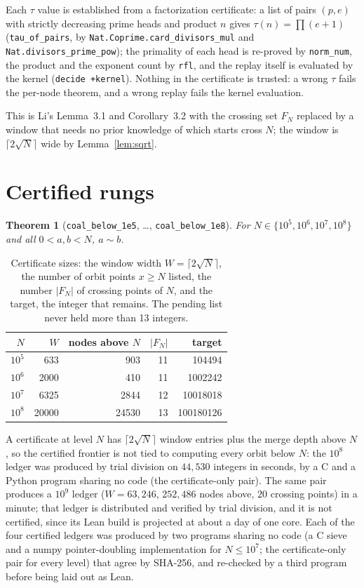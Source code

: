 \documentclass[11pt]{article}
\theoremstyle{plain}
\newtheorem{theorem}{Theorem}[section]
\theoremstyle{definition}
\newcommand{\Coal}{\sim}
\begin{document}
Each $\tau$ value is established from a factorization certificate: a list of pairs $(p,e)$ with strictly decreasing prime heads and product $n$ gives $\tau(n)=\prod(e+1)$ (\texttt{tau\_of\_pairs}, by \texttt{Nat.Coprime.card\_divisors\_mul} and \texttt{Nat.divisors\_prime\_pow}); the primality of each head is re-proved by \texttt{norm\_num}, the product and the exponent count by \texttt{rfl}, and the replay itself is evaluated by the kernel (\texttt{decide +kernel}). Nothing in the certificate is trusted: a wrong $\tau$ fails the per-node theorem, and a wrong replay fails the kernel evaluation.

This is Li's Lemma~3.1 and Corollary~3.2 with the crossing set $F_N$ replaced by a window that needs no prior knowledge of which starts cross $N$; the window is $\lceil 2\sqrt N\rceil$ wide by Lemma~\ref{lem:sqrt}.

\section{Certified rungs}
\label{sec:rungs}

\begin{theorem}[\texttt{coal\_below\_1e5}, \dots, \texttt{coal\_below\_1e8}]
\label{thm:rungs}
For $N\in\{10^5,10^6,10^7,10^8\}$ and all $0<a,b<N$, $a\Coal b$.
\end{theorem}

\begin{table}[h]
\centering
\begin{tabular}{@{}rrrrr@{}}
\toprule
$N$ & $W$ & nodes above $N$ & $|F_N|$ & target \\
\midrule
$10^5$ & 633 & 903 & 11 & 104494 \\
$10^6$ & 2000 & 410 & 11 & 1002242 \\
$10^7$ & 6325 & 2844 & 12 & 10018018 \\
$10^8$ & 20000 & 24530 & 13 & 100180126 \\
\bottomrule
\end{tabular}
\caption{Certificate sizes: the window width $W=\lceil 2\sqrt N\rceil$, the number of orbit points $x\ge N$ listed, the number $|F_N|$ of crossing points of $N$, and the target, the integer that remains. The pending list never held more than 13 integers.}
\label{tab:rungs}
\end{table}

A certificate at level $N$ has $\lceil 2\sqrt N\rceil$ window entries plus the merge depth above $N$, so the certified frontier is not tied to computing every orbit below $N$: the $10^8$ ledger was produced by trial division on $44{,}530$ integers in seconds, by a C and a Python program sharing no code (the certificate-only pair). The same pair produces a $10^9$ ledger ($W=63{,}246$, $252{,}486$ nodes above, $20$ crossing points) in a minute; that ledger is distributed and verified by trial division, and it is not certified, since its Lean build is projected at about a day of one core. Each of the four certified ledgers was produced by two programs sharing no code (a C sieve and a numpy pointer-doubling implementation for $N\le10^7$; the certificate-only pair for every level) that agree by SHA-256, and re-checked by a third program before being laid out as Lean.
\end{document}
